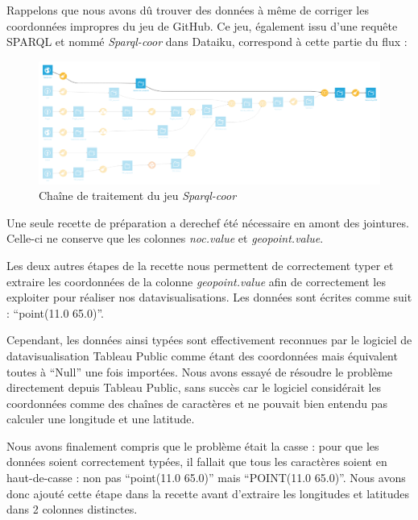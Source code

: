 \documentclass[hidelinks, 12pt]{report}
\begin{document}
Rappelons que nous avons dû trouver des données à même de corriger les coordonnées impropres du jeu de GitHub. Ce jeu, également issu d'une requête SPARQL et nommé \textit{Sparql-coor} dans Dataiku, correspond à cette partie du flux :

\begin{center}
	\begin{figure}[H]
		\setlength{\belowcaptionskip}{-35pt}
		\includegraphics[scale=0.35]{images/flow-medals-sparql-coor.png}
		\caption{Chaîne de traitement du jeu \textit{Sparql-coor}}
	\end{figure}
\end{center}

Une seule recette de préparation a derechef été nécessaire en amont des jointures. Celle-ci ne conserve que les colonnes \textit{noc.value} et \textit{geopoint.value}.

Les deux autres étapes de la recette nous permettent de correctement typer et extraire les coordonnées de la colonne \textit{geopoint.value} afin de correctement les exploiter pour réaliser nos datavisualisations. \label{casse}Les données sont écrites comme suit : \enquote{point(11.0 65.0)}.

Cependant, les données ainsi typées sont effectivement reconnues par le logiciel de datavisualisation Tableau Public comme étant des coordonnées mais équivalent toutes à \enquote{Null} une fois importées. Nous avons essayé de résoudre le problème directement depuis Tableau Public, sans succès car le logiciel considérait les coordonnées comme des chaînes de caractères et ne pouvait bien entendu pas calculer une longitude et une latitude.

Nous avons finalement compris que le problème était la casse : pour que les données soient correctement typées, il fallait que tous les caractères soient en haut-de-casse : non pas \enquote{point(11.0 65.0)} mais \enquote{POINT(11.0 65.0)}. Nous avons donc ajouté cette étape dans la recette avant d'extraire les longitudes et latitudes dans 2 colonnes distinctes.
\end{document}

